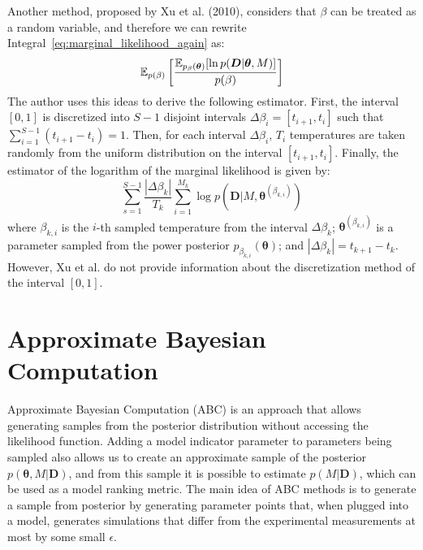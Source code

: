 Another method, proposed by Xu et al. (2010), considers that $\beta$ can
be treated as a random variable, and therefore we can rewrite 
Integral~\ref{eq:marginal_likelihood_again} as:
\begin{equation}
    \mathbb{E}_{p (\beta)} 
        \left[\frac
            {\mathbb{E}_{p_\beta ({\bm \theta})}[\ln p({\bm D}|{\bm
            \theta}, M)]}
            {p (\beta)}
        \right]
\end{equation}
The author uses this ideas to derive the following estimator. First, 
the interval $[0, 1]$ is discretized into $S - 1$ disjoint intervals 
$\Delta\beta_i = [t_{i + 1}, t_i]$ such that  $\sum_{i = 1}^{S - 1} 
(t_{i + 1} - t_{i}) = 1$. Then, for each interval $\Delta\beta_i$, $T_i$ 
temperatures are taken randomly from the uniform distribution on the 
interval $[t_{i + 1}, t_i]$. Finally, the estimator of the logarithm of
the marginal likelihood is given by:
\begin{equation}
    \sum_{s = 1}^{S - 1}\frac{|\Delta\beta_k|}
                             {T_k}
        \sum_{i = 1}^{M_k} \log p ({\bm D} | M, {\bm \theta}^{(\beta_{k,
        i})})
\end{equation}
where $\beta_{k, i}$ is the $i$-th sampled temperature from the interval
$\Delta\beta_k$; ${\bm \theta}^{(\beta_{k, i})}$ is a parameter sampled 
from the power posterior $p_{\beta_{k, i}} ({\bm \theta})$; and 
$|\Delta\beta_k| = t_{k + 1} - t_k$. However, Xu et al. do not provide
information about the discretization method of the interval $[0, 1]$.


\section{Approximate Bayesian Computation}
\label{sec:abc_method}
Approximate Bayesian Computation (ABC) is an approach that allows 
generating samples from the posterior distribution without accessing the
likelihood function. Adding a model indicator parameter to parameters 
being sampled also allows us to create an approximate sample of the 
posterior $p ({\bm \theta}, M | {\bm D})$, and from this sample it is
possible to estimate $p (M | {\bm D})$, which can be used as a model
ranking metric. The main idea of ABC methods is to generate a sample
from posterior by generating parameter points that, when plugged into a
model, generates simulations that differ from the experimental 
measurements at most by some small $\epsilon$.

